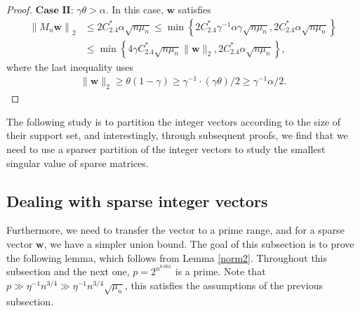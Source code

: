 \documentclass{article}
\numberwithin{equation}{section}
\theoremstyle{plain}
\begin{document}
\begin{proof}
$\textbf{Case II}$: $\gamma \theta>\alpha$. In this case, $\boldsymbol{w}$ satisfies
\begin{align*}
\left\|M_n \boldsymbol{w}\right\|_2 & \leq 2 C^*_{2.4} \alpha \sqrt{n\mu_{n}} \leq \min \left\{2 C^*_{2.4} \gamma^{-1} \alpha \gamma \sqrt{n\mu_{n}}, 2 C^*_{2.4} \alpha \sqrt{n\mu_{n}}\right\} \\
& \leq \min \left\{4 \gamma C^*_{2.4} \sqrt{n\mu_{n}}\|\boldsymbol{w}\|_2, 2 C^*_{2.4} \alpha \sqrt{n\mu_{n}}\right\},
\end{align*}
where the last inequality uses
\begin{align*}
\|\boldsymbol{w}\|_2 \geq \theta(1-\gamma) \geq \gamma^{-1} \cdot(\gamma \theta) / 2 \geq \gamma^{-1} \alpha / 2 .
\end{align*}
\end{proof}
\par
The following study is to partition the integer vectors according to the size of their support set, and interestingly, through subsequent proofs, we find that we need to use a sparser partition of the integer vectors to study the smallest singular value of sparse matrices.

\subsection{Dealing with sparse integer vectors}
Furthermore, we need to transfer the vector to a prime range, and for a sparse vector $\boldsymbol{w}$, we have a simpler union bound. The goal of this subsection is to prove the following lemma, which follows from Lemma \ref{norm2}. Throughout this subsection and the next one, $p=2^{n^{0.001}}$ is a prime. Note that $p \gg \eta^{-1} n^{3 / 4}\gg \eta^{-1} n^{3 / 4}\sqrt{\mu_{n}}$, this satisfies the assumptions of the previous subsection.
\end{document}
